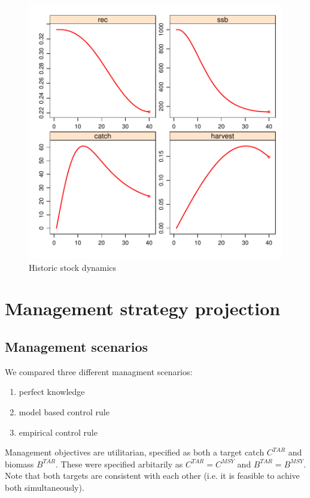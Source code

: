 \documentclass[a4paper]{article}
\begin{document}
\begin{figure}
\centering
\includegraphics{script-hist_proj_plot}
\caption{Historic stock dynamics}
\label{fig:hist_proj}
\end{figure}

\section{Management strategy projection}

\subsection{Management scenarios}

We compared three different managment scenarios:
\begin{enumerate}
\item perfect knowledge
\item model based control rule
\item empirical control rule
\end{enumerate}

Management objectives are utilitarian, specified as both a target catch $C^{TAR}$ and biomass $B^{TAR}$. 
These were specified arbitarily as $C^{TAR} = C^{MSY}$ and $B^{TAR} = B^{MSY}$.
Note that both targets are consistent with each other (i.e. it is feasible to achive both simultaneously).
\end{document}
